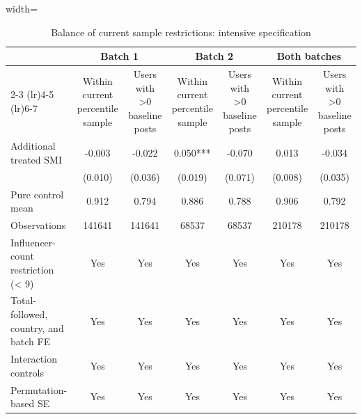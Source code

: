 \begin{table}[!htbp]
    \centering
    \caption{Balance of current sample restrictions: intensive specification}
    \label{tab:sample_restrictions_intensive}
    \scriptsize
    \begin{adjustbox}{width=\textwidth}
    \begin{tabular}{lcccccc}
    \toprule
     & \multicolumn{2}{c}{Batch 1} & \multicolumn{2}{c}{Batch 2} & \multicolumn{2}{c}{Both batches} \\
    \cmidrule(lr){2-3} \cmidrule(lr){4-5} \cmidrule(lr){6-7}
     & Within current percentile sample & Users with >0 baseline posts & Within current percentile sample & Users with >0 baseline posts & Within current percentile sample & Users with >0 baseline posts \\
    \midrule
    Additional treated SMI & -0.003 & -0.022 & 0.050*** & -0.070 & 0.013 & -0.034 \\
     & (0.010) & (0.036) & (0.019) & (0.071) & (0.008) & (0.035) \\
    Pure control mean & 0.912 & 0.794 & 0.886 & 0.788 & 0.906 & 0.792 \\
    Observations & 141641 & 141641 & 68537 & 68537 & 210178 & 210178 \\
    Influencer-count restriction (< 9) & Yes & Yes & Yes & Yes & Yes & Yes \\
    Total-followed, country, and batch FE & Yes & Yes & Yes & Yes & Yes & Yes \\
    Interaction controls & Yes & Yes & Yes & Yes & Yes & Yes \\
    Permutation-based SE & Yes & Yes & Yes & Yes & Yes & Yes \\
    \bottomrule
    \end{tabular}
    \end{adjustbox}
\end{table}
